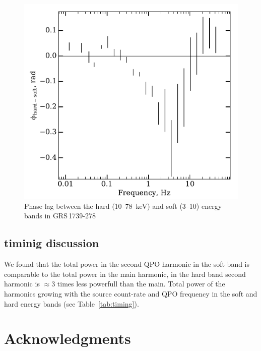 \documentclass[a4paper,fleqn,usenatbib]{mnras}
\def\grs{{GRS\,1739-278\,}}
\begin{document}
\begin{figure}
        \includegraphics[width=\columnwidth]{Phase_lag.pdf}
        \caption{Phase lag between the hard (10--78~keV) and soft (3--10) energy bands in \grs}
        \label{fig:phase_lag}
\end{figure}

\subsection{timinig discussion}
We found that the total power in the second QPO harmonic in the soft band is comparable to the total power in the main harmonic, in the hard band second harmonic is $\approx3$ times less powerfull than the main. 
Total power of the harmonics growing with the source count-rate and QPO frequency in the soft and hard energy bands (see Table~\ref{tab:timing}). 


\section*{Acknowledgments}



\bsp	
\label{lastpage}
\end{document}
